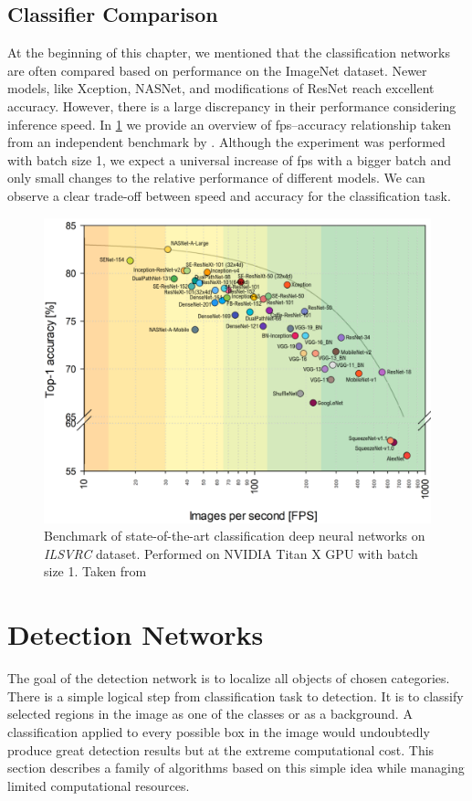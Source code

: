 \subsection{Classifier Comparison}
\label{sec:cnncomp}
At the beginning of this chapter, we mentioned that the classification networks are often compared based on performance on the ImageNet dataset. Newer models, like Xception, NASNet, and modifications of ResNet reach excellent accuracy. However, there is a large discrepancy in their performance considering inference speed. In \cref{fig:cnnbenchmark} we provide an overview of fps--accuracy relationship taken from an independent benchmark by \citeauthor{bib:cnnbenchmark} \cite{bib:cnnbenchmark}. Although the experiment was performed with batch size 1, we expect a universal increase of fps with a bigger batch and only small changes to the relative performance of different models. We can observe a clear trade-off between speed and accuracy for the classification task.

\begin{figure}
    \includegraphics[width=\textwidth]{img/fps_comp}
    \caption[Benchmark of classification CNNs]%
    {Benchmark of state-of-the-art classification deep neural networks on \textit{ILSVRC} dataset. Performed on NVIDIA
Titan X GPU with batch size 1. Taken from \cite[fig. 3]{bib:cnnbenchmark}}
    \label{fig:cnnbenchmark}
\end{figure}



\section{Detection Networks}
\label{sec:detnets}
The goal of the detection network is to localize all objects of chosen categories. There is a simple logical step from classification task to detection. It is to classify selected regions in the image as one of the classes or as a background. A classification applied to every possible box in the image would undoubtedly produce great detection results but at the extreme computational cost. This section describes a family of algorithms based on this simple idea while managing limited computational resources.

